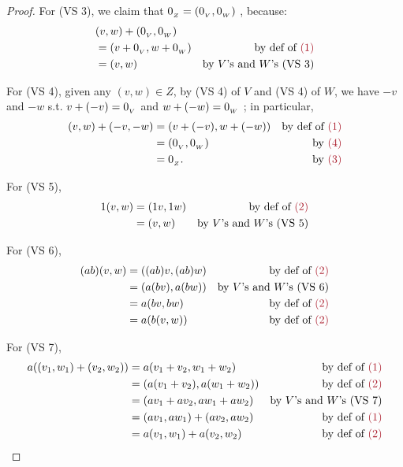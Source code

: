 \begin{proof}
For (VS 3), we claim that \(0_{_Z} = (0_{_V}, 0_{_W})\) , because:
\begin{align*}
    & (v, w) + (\OV, \OW) \\
    & = (v + \OV, w + \OW) & \text{by def of \MAROON{(1)}} \\
    & = (v, w) & \text{by \(V\)'s and \(W\)'s (VS 3)}
\end{align*}

For (VS 4), given any \((v, w) \in Z\), by (VS 4) of \(V\) and (VS 4) of \(W\), we have \(-v\) and \(-w\) s.t. \(v + (-v) = 0_{_V}\) and \(w + (-w) = 0_{_W}\) ;
in particular,
\begin{align*}
    (v, w) + (-v, -w) & = (v + (-v), w + (-w)) & \text{by def of \MAROON{(1)}} \\
                      & = (\OV, \OW) & \text{by \MAROON{(4)}} \\
                      & = 0_{_Z}. & \text{by \MAROON{(3)}}
\end{align*}

For (VS 5),
\begin{align*}
    1 (v, w) & = (1v, 1w) & \text{by def of \MAROON{(2)}} \\
             & = (v, w) & \text{by \(V\)'s and \(W\)'s (VS 5)}
\end{align*}

For (VS 6),
\begin{align*}
    (ab) (v, w) & = ((ab) v, (ab) w) & \text{by def of \MAROON{(2)}} \\
                & = (a(bv), a(bw)) & \text{by \(V\)'s and \(W\)'s (VS 6)} \\
                & = a(bv, bw) & \text{by def of \MAROON{(2)}} \\
                & = a(b(v, w)) & \text{by def of \MAROON{(2)}}
\end{align*}
    
For (VS 7),
\begin{align*}
    a((v_1, w_1) + (v_2, w_2)) & = a(v_1 + v_2, w_1 + w_2) & \text{by def of \MAROON{(1)}} \\
                               & = (a(v_1 + v_2), a(w_1 + w_2)) & \text{by def of \MAROON{(2)}} \\
                               & = (a v_1 + a v_2, a w_1 + a w_2) & \text{by \(V\)'s and \(W\)'s (VS 7)} \\
                               & = (a v_1, a w_1) + (a v_2, a w_2) & \text{by def of \MAROON{(1)}} \\
                               & = a(v_1, w_1) + a(v_2, w_2) & \text{by def of \MAROON{(2)}}
\end{align*}
    

\end{proof}
